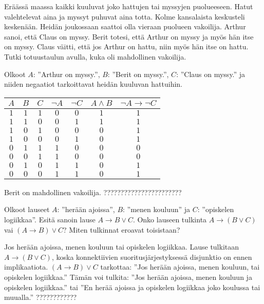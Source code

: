 \begin{tehtavasivu}
\begin{tehtava}
     Eräässä maassa kaikki kuuluvat joko hattujen tai myssyjen puolueeseen. Hatut valehtelevat aina ja myssyt puhuvat aina totta. Kolme kansalaista keskusteli keskenään. Heidän joukossaan saattoi olla vieraan puolueen vakoilija. Arthur sanoi, että Claus on myssy. Berit totesi, että Arthur on myssy ja myös hän itse on myssy. Claus väitti, että jos Arthur on hattu, niin myös hän itse on hattu. Tutki totuustaulun avulla, kuka oli mahdollinen vakoilija.
     \begin{vastaus} \newline
    Olkoot $A$: ''Arthur on myssy.'', $B$: ''Berit on myssy.'', $C$: ''Claus on myssy.'' ja niiden negaatiot tarkoittavat heidän kuuluvan hattuihin.
        \begin{center}
		    \begin{tabular}{|c|c|c|c|c|c|c|}\hline
		    $A$ & $B$ & $C$ & $\lnot A$ & $\lnot C$ & $A\land B$ & $\lnot A\to \lnot C$ \\ \hline
		    $1$ & $1$ & $1$ & $0$ & $0$ & $1$ & $1$ \\ %
		    $1$ & $1$ & $0$ & $0$ & $1$ & $1$ & $1$ \\
		    $1$ & $0$ & $1$ & $0$ & $0$ & $0$ & $1$ \\
		    $1$ & $0$ & $0$ & $0$ & $1$ & $0$ & $1$ \\
		    $0$ & $1$ & $1$ & $1$ & $0$ & $0$ & $0$ \\
		    $0$ & $0$ & $1$ & $1$ & $0$ & $0$ & $0$ \\
		    $0$ & $1$ & $0$ & $1$ & $1$ & $0$ & $1$ \\
		    $0$ & $0$ & $0$ & $1$ & $1$ & $0$ & $1$ \\ \hline
\end{tabular}
\end{center}
		Berit on mahdollinen vakoilija. ??????????????????????? %
    \end{vastaus}
    
\end{tehtava}

\begin{tehtava}
     Olkoot lauseet $A$: ''herään ajoissa'', $B$: ''menen kouluun'' ja $C$: ''opiskelen logiikkaa''.
     Esitä sanoin lause $A \to B \lor C$. Onko lauseen tulkinta $A \to (B \lor C)$ vai $(A \to B) \lor C$? Miten tulkinnat eroavat toisistaan? 
        \begin{vastaus} \newline
	 Jos herään ajoissa, menen kouluun tai opiskelen logiikkaa. Lause tulkitaan $A\to (B\lor C)$, koska konnektiivien suoritusjärjestyksessä disjunktio on ennen implikaatiota. $(A\to B)\lor C$ tarkottaa: ''Jos herään ajoissa, menen kouluun, tai opiskelen logiikkaa.'' Tämän voi tulkita: ''Jos herään ajoissa, menen kouluun ja opiskelen logiikkaa.'' tai ''En herää ajoissa ja opiskelen logiikkaa joko koulussa tai muualla.'' ???????????? 
    \end{vastaus}
    

\end{tehtava}
\end{tehtavasivu}
